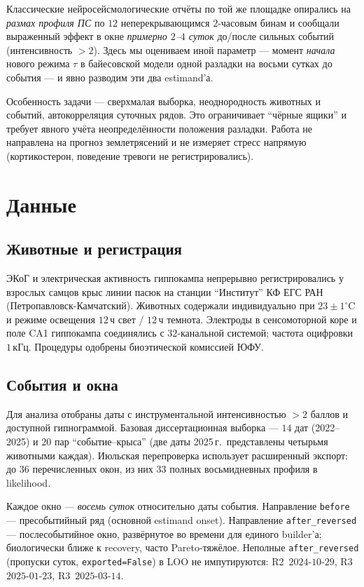 \documentclass{article}
\begin{document}
Классические нейросейсмологические отчёты по той же площадке опирались
на \emph{размах профиля ПС} по $12$ неперекрывающимся $2$-часовым бинам
и сообщали выраженный эффект в окне \emph{примерно $2$--$4$ суток}
до/после сильных событий (интенсивность $>2$). Здесь мы оцениваем иной
параметр --- момент \emph{начала} нового режима $\tau$ в байесовской
модели одной разладки на восьми сутках до события --- и явно разводим
эти два estimand'а.

Особенность задачи --- сверхмалая выборка, неоднородность животных и
событий, автокорреляция суточных рядов. Это ограничивает ``чёрные
ящики'' и требует явного учёта неопределённости положения разладки.
Работа не направлена на прогноз землетрясений и не измеряет стресс
напрямую (кортикостерон, поведение тревоги не регистрировались).

\section{Данные}

\subsection{Животные и регистрация}

ЭКоГ и электрическая активность гиппокампа непрерывно регистрировались у
взрослых самцов крыс линии пасюк на станции ``Институт'' КФ ЕГС РАН
(Петропавловск-Камчатский). Животных содержали индивидуально при
$23\pm1^{\circ}$C и режиме освещения $12$\,ч свет / $12$\,ч темнота.
Электроды в сенсомоторной коре и поле CA1 гиппокампа соединялись с
$32$-канальной системой; частота оцифровки $1$\,кГц. Процедуры одобрены
биоэтической комиссией ЮФУ.

\subsection{События и окна}

Для анализа отобраны даты с инструментальной интенсивностью $>2$ баллов
и доступной гипнограммой. Базовая диссертационная выборка --- $14$ дат
(2022--2025) и $20$ пар ``событие--крыса'' (две даты 2025\,г.\
представлены четырьмя животными каждая). Июльская перепроверка
использует расширенный экспорт: до $36$ перечисленных окон, из них
$33$ полных восьмидневных профиля в likelihood.

Каждое окно --- \emph{восемь суток} относительно даты события.
Направление \texttt{before} --- пресобытийный ряд (основной estimand
onset). Направление \texttt{after\_reversed} --- послесобытийное окно,
развёрнутое во времени для единого builder'а; биологически ближе к
recovery, часто Pareto-тяжёлое. Неполные \texttt{after\_reversed}
(пропуски суток, \texttt{exported=False}) в LOO не импутируются:
R2~$2024$-$10$-$29$, R3~$2025$-$01$-$23$, R3~$2025$-$03$-$14$.
\end{document}
